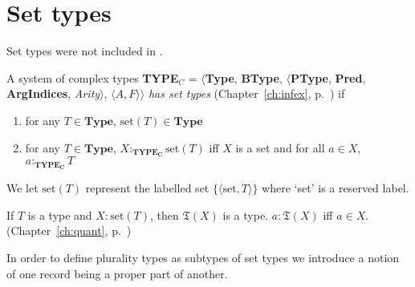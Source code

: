 \section{Set types}
\label{app:settypes}

Set types were not included in \cite{Cooper2012}.

A system of complex types {\bf TYPE$_C$} = $\langle${\bf Type}, {\bf BType},
$\langle$\textbf{PType}, {\bf Pred}, \textbf{ArgIndices}, {\it
  Arity\/}$\rangle$, $\langle A,F\rangle$$\rangle$ \textit{has set
  types} (Chapter~\ref{ch:infex}, p.~\pageref{ex:settypes}) if
\begin{enumerate} 
 
\item for any $T \in \textbf{Type}$, $\mathrm{set}(T) \in \textbf{Type}$ 
 
\item for any $T \in \textbf{Type}$, 
$X:_{\mathbf{TYPE_C}}\mathrm{set}(T)$ iff  $X$ is a set and 
  for all $a\in X$, $a:_{\mathbf{TYPE_C}}T$
   
 
\end{enumerate}

We let $\mathrm{set}(T)$ represent the labelled set
$\{\langle\mathrm{set},T\rangle\}$ where `set' is a reserved
label.

If $T$ is a type and $X:\mathrm{set}(T)$, then $\mathfrak{T}(X)$ is a
type.  $a:\mathfrak{T}(X)$ iff $a\in X$. (Chapter~\ref{ch:quant},
p.~\pageref{ex:mathfrakT})

 

In order to define plurality types as subtypes of set types we
introduce a notion of one record being a proper part of another.

